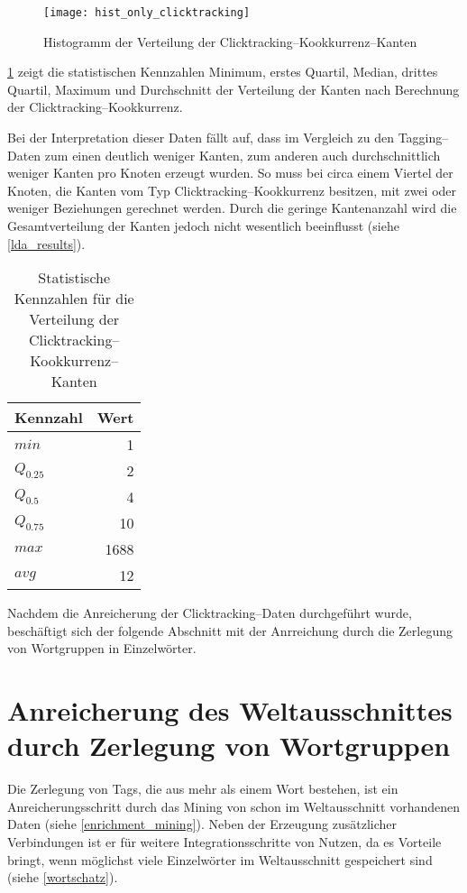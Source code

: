 \begin{figure}[t]
\centering
\texttt{[image: hist\_only\_clicktracking]}
\caption{Histogramm der Verteilung der Clicktracking--Kookkurrenz--Kanten}
\label{fig:hist_only_clicktracking}
\end{figure}

\cref{tab:only_clicktracking} zeigt die statistischen Kennzahlen Minimum, erstes Quartil, Median, drittes Quartil, Maximum und Durchschnitt der Verteilung der Kanten nach Berechnung der Clicktracking--Kookkurrenz.

Bei der Interpretation dieser Daten fällt auf, dass im Vergleich zu den Tagging--Daten zum einen deutlich weniger Kanten, zum anderen auch durchschnittlich weniger Kanten pro Knoten erzeugt wurden. So muss bei circa einem Viertel der Knoten, die Kanten vom Typ Clicktracking--Kookkurrenz besitzen, mit zwei oder weniger Beziehungen gerechnet werden. Durch die geringe Kantenanzahl wird die Gesamtverteilung der Kanten jedoch nicht wesentlich beeinflusst (siehe \cref{lda_results}).

\begin{table}[h]
\centering
\begin{tabular}{lr}
    \toprule
    Kennzahl & Wert \\
    \midrule
    \(min\) & \num{1} \\
    \(Q_{0.25}\) & \num{2} \\
    \(Q_{0.5}\) & \num{4} \\
    \(Q_{0.75}\) & \num{10} \\
    \(max\) &  \num{1688} \\
    \(avg\) &  \num{12} \\
    \bottomrule
\end{tabular}
\caption{Statistische Kennzahlen für die Verteilung der Clicktracking--Kookkurrenz--Kanten}
\label{tab:only_clicktracking}
\end{table}

Nachdem die Anreicherung der Clicktracking--Daten durchgeführt wurde, beschäftigt sich der folgende Abschnitt mit der Anrreichung durch die Zerlegung von Wortgruppen in Einzelwörter.

\section{Anreicherung des Weltausschnittes durch Zerlegung von Wortgruppen}
\label{decomposition}

Die Zerlegung von Tags, die aus mehr als einem Wort bestehen, ist ein Anreicherungsschritt durch das Mining von schon im Weltausschnitt vorhandenen Daten (siehe \cref{enrichment_mining}). Neben der Erzeugung zusätzlicher Verbindungen ist er für weitere Integrationsschritte von Nutzen, da es Vorteile bringt, wenn möglichst viele Einzelwörter im Weltausschnitt gespeichert sind (siehe \cref{wortschatz}).

